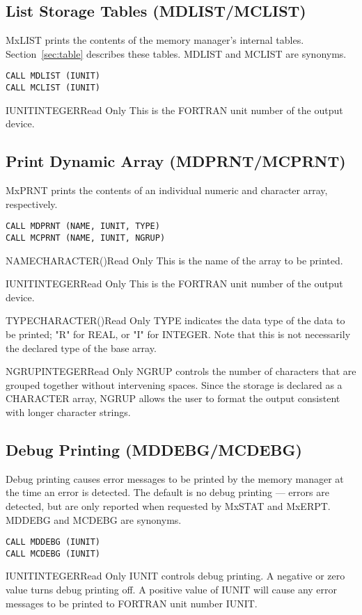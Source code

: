 \subsection{List Storage Tables (MDLIST/MCLIST)}
MxLIST prints the contents of the memory manager's internal
tables. Section~\ref{sec:table} describes these tables. MDLIST and MCLIST
are synonyms. 
\begin{verbatim}
CALL MDLIST (IUNIT)
CALL MCLIST (IUNIT)
\end{verbatim}

\begin{argy}{IUNIT}{INTEGER}{Read Only}
This is the FORTRAN unit number of the output device.
\end{argy}

\subsection{Print Dynamic Array (MDPRNT/MCPRNT)}
MxPRNT prints the contents of an individual numeric and
character array, respectively.
\begin{verbatim}
CALL MDPRNT (NAME, IUNIT, TYPE)
CALL MCPRNT (NAME, IUNIT, NGRUP)
\end{verbatim}

\begin{argy}{NAME}{CHARACTER\last(\last)}{Read Only}
This is the name of the array to be printed.
\end{argy}

\begin{argy}{IUNIT}{INTEGER}{Read Only}
This is the FORTRAN unit number of the output device.
\end{argy}

\begin{argy}{TYPE}{CHARACTER\last(\last)}{Read Only}
TYPE indicates the data type of the data to be printed; "R" for REAL, or
"I" for INTEGER.  Note that this is not necessarily the declared type of the
base array.
\end{argy}

\begin{argy}{NGRUP}{INTEGER}{Read Only}
NGRUP controls the number of characters that are grouped together without
intervening spaces. Since the storage is declared as a CHARACTER
array, NGRUP allows the user to format the output consistent with longer
character strings.
\end{argy}

\subsection{Debug Printing (MDDEBG/MCDEBG)}
Debug printing causes error messages to be printed by the memory manager at
the time an error is detected. The default is no debug printing --- errors
are detected, but are only reported when re\-quest\-ed by MxSTAT and
MxERPT. MDDEBG and MCDEBG are synonyms.
\begin{verbatim}
CALL MDDEBG (IUNIT)
CALL MCDEBG (IUNIT)
\end{verbatim}

\begin{argy}{IUNIT}{INTEGER}{Read Only}
IUNIT controls debug printing. A negative or zero value
turns debug printing off. A positive value of IUNIT will cause any error
messages to be printed to FORTRAN unit number IUNIT.
\end{argy}

